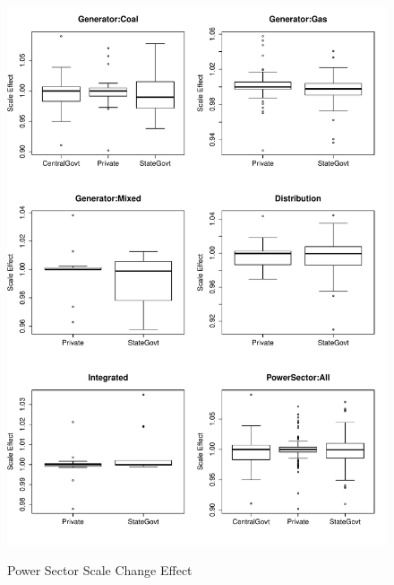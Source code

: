 \begin{figure}[ht]
	\centering
	\caption{Power Sector Scale Change Effect}
		\includegraphics[width=1.00\textwidth]{chapter03/ScaleEffect.pdf}	
	\label{fig:ScaleEffect}
\end{figure}


